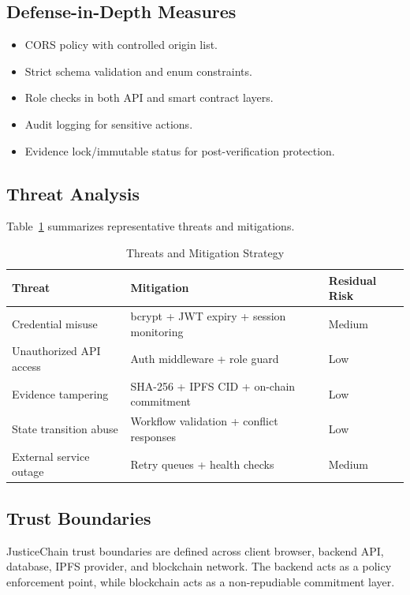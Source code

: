 \documentclass[conference]{IEEEtran}
\begin{document}
\subsection{Defense-in-Depth Measures}
\begin{itemize}
    \item CORS policy with controlled origin list.
    \item Strict schema validation and enum constraints.
    \item Role checks in both API and smart contract layers.
    \item Audit logging for sensitive actions.
    \item Evidence lock/immutable status for post-verification protection.
\end{itemize}

\subsection{Threat Analysis}
Table~\ref{tab:threats} summarizes representative threats and mitigations.

\begin{table}[!t]
\caption{Threats and Mitigation Strategy}
\label{tab:threats}
\centering
\begin{tabular}{p{2.7cm} p{3.1cm} p{1.2cm}}
\hline
\textbf{Threat} & \textbf{Mitigation} & \textbf{Residual Risk} \\
\hline
Credential misuse & bcrypt + JWT expiry + session monitoring & Medium \\
Unauthorized API access & Auth middleware + role guard & Low \\
Evidence tampering & SHA-256 + IPFS CID + on-chain commitment & Low \\
State transition abuse & Workflow validation + conflict responses & Low \\
External service outage & Retry queues + health checks & Medium \\
\hline
\end{tabular}
\end{table}

\subsection{Trust Boundaries}
JusticeChain trust boundaries are defined across client browser, backend API, database, IPFS provider, and blockchain network. The backend acts as a policy enforcement point, while blockchain acts as a non-repudiable commitment layer.
\end{document}
